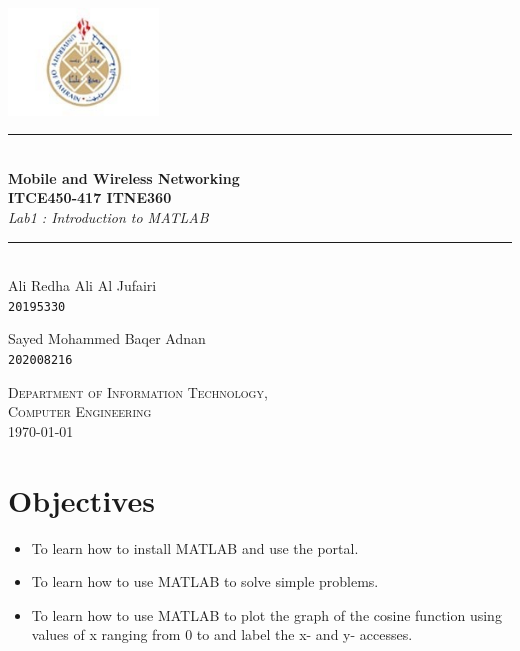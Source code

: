 \documentclass[12pt,a4paper]{article}
\newcommand{\HRule}{\rule{\linewidth}{0.5mm}}
\begin{document}
\begin{titlepage}
  \begin{center}

    \includegraphics[width=0.3\textwidth]{images/Picture2.jpg}~\\[2cm]


    \HRule \\[0.4cm]
    { \LARGE
    \textbf{Mobile and Wireless Networking }\\[0.4cm]
    \textbf{ITCE450-417 ITNE360}\\[0.4cm]
    \emph{Lab1 : Introduction to MATLAB}\\[0.4cm]
    }
    \HRule \\[1.5cm]



    { \large
    Ali Redha Ali Al Jufairi \\[0.1cm]
    \texttt{20195330}
    }

    { \large
    Sayed Mohammed Baqer Adnan\\[0.1cm]
    \texttt{202008216}
    }
    \vfill

    \textsc{\large Department of Information Technology,\\Computer Engineering }\\[0.4cm]


    {\large \today}

  \end{center}
\end{titlepage}


\newpage



\section{Objectives}
\begin{itemize}
  \item To learn how to install  MATLAB and use the portal.
  \item To learn how to use MATLAB to solve simple problems.
  \item  To learn how to use MATLAB to plot the graph of the cosine function using values of x ranging from 0 to and label the x- and y- accesses.
\end{itemize}
\end{document}
